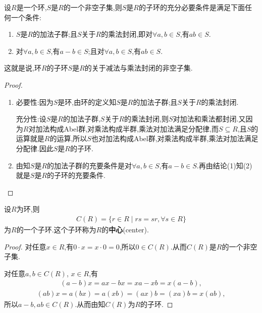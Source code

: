 \documentclass[../../main.tex]{subfiles}%
\begin{document}
\begin{theorem}\label{theorem:子环的充要条件--抽象代数}
设$R$是一个环,$S$是$R$的一个非空子集,则$S$是$R$的子环的充分必要条件是满足下面任何一个条件:
\begin{enumerate}[(1)]
\item\label{theorem:子环的充要条件--抽象代数-1} $S$是$R$的加法子群;且$S$关于$R$的乘法封闭,即对$\forall a,b\in S$,有$ab\in S$.

\item\label{theorem:子环的充要条件--抽象代数-2} 对$\forall a,b\in S$,有$a-b\in S$;且对$\forall a,b\in S$,有$ab\in S$.
\end{enumerate}
\end{theorem}
\begin{remark}
这就是说,环$R$的子环$S$是$R$的关于减法与乘法封闭的非空子集.
\end{remark}
\begin{proof}
\begin{enumerate}[(1)]
\item {\heiti 必要性:}因为$S$是环,由环的定义知$S$是$R$的加法子群;且$S$关于$R$的乘法封闭.

{\heiti 充分性:}设$S$是$R$的加法子群,$S$关于$R$的乘法封闭,则$S$对加法和乘法都封闭.又因为$R$对加法构成Abel群,对乘法构成半群,乘法对加法满足分配律,而$S\subseteq R$,且$S$的运算就是$R$的运算,所以$S$也对加法构成Abel群,对乘法构成半群,乘法对加法满足分配律.因此$S$是$R$的子环.

\item 由知$S$是$R$的加法子群的充要条件是对$\forall a,b\in S$,有$a-b\in S$.再由结论(1)知(2)就是$S$是$R$的子环的充要条件.
\end{enumerate}
\end{proof}

\begin{theorem}
设$R$为环,则
\begin{align*}
C(R) = \{r \in R \mid rs = sr, \forall s \in R\}
\end{align*}
为$R$的一个子环.这个子环称为$R$的\textbf{中心}(center).
\end{theorem}
\begin{proof}
对任意$x \in R$,有$0 \cdot x = x \cdot 0 = 0$,所以$0 \in C(R)$.从而$C(R)$是$R$的一个非空子集.

对任意$a,b \in C(R)$, $x \in R$,有
\begin{align*}
(a - b)x = ax - bx = xa - xb = x(a - b),
\end{align*}
\begin{align*}
(ab)x = a(bx) = a(xb) = (ax)b = (xa)b = x(ab),
\end{align*}
所以$a - b, ab \in C(R)$.从而由知$C(R)$为$R$的子环.
\end{proof}
\end{document}
